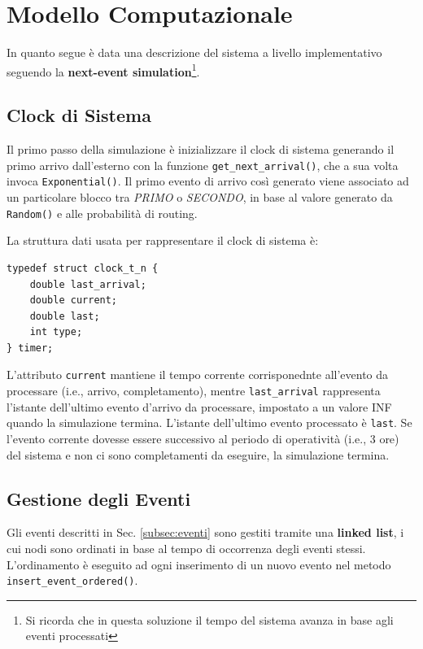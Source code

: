\documentclass{article}
\begin{document}
\section{Modello Computazionale}\label{sec:computazionale}

In quanto segue è data una descrizione del sistema a livello implementativo seguendo la \textbf{next-event simulation}\footnote{Si ricorda che in questa soluzione il tempo del sistema avanza in base agli eventi processati}.

\subsection{Clock di Sistema}

Il primo passo della simulazione è inizializzare il clock di sistema generando il primo arrivo dall'esterno con la funzione \texttt{get\_next\_arrival()}, che a sua volta invoca \texttt{Exponential()}. Il primo evento di arrivo così generato viene associato ad un particolare blocco tra \textit{PRIMO} o \textit{SECONDO}, in base al valore generato da \texttt{Random()} e alle probabilità di routing.

La struttura dati usata per rappresentare il clock di sistema è:
\begin{lstlisting}
typedef struct clock_t_n {
    double last_arrival;        
    double current;                 
    double last;                    
    int type;                       
} timer;
\end{lstlisting}
L'attributo \texttt{current} mantiene il tempo corrente corrisponednte all'evento da processare (i.e., arrivo, completamento), mentre \texttt{last\_arrival} rappresenta l'istante dell'ultimo evento d'arrivo da processare, impostato a un valore INF quando la simulazione termina. L'istante dell'ultimo evento processato è \texttt{last}. Se l'evento corrente dovesse essere successivo al periodo di operatività  (i.e., 3 ore) del sistema e non ci sono completamenti da eseguire, la simulazione termina.

\subsection{Gestione degli Eventi}

Gli eventi descritti in Sec. \ref{subsec:eventi} sono gestiti tramite una \textbf{linked list}, i cui nodi sono ordinati in base al tempo di occorrenza degli eventi stessi. L'ordinamento è eseguito ad ogni inserimento di un nuovo evento nel metodo \texttt{insert\_event\_ordered()}. 
\end{document}
